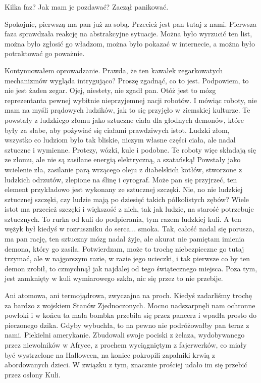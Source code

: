 \ds{} Kilka faz? Jak mam je pozdawać? \dm{} Zaczął panikować. \de{}

\ds{} Spokojnie, pierwszą ma pan już za sobą. Przecież jest pan tutaj z nami. 
Pierwsza faza sprawdzała reakcję na abstrakcyjne sytuacje.
Można było wyrzucić ten list, można było zgłosić go władzom, można było pokazać w internecie, a można było potraktować go poważnie. \de{}

Kontynuowałem oprowadzanie.
Prawda, że ten kawałek zegarkowatych mechanizmów wygląda intrygująco? 
Proszę zgadnąć, co to jest. Podpowiem, to nie jest żaden zegar.
Ojej, niestety, nie zgadł pan.
Otóż jest to mózg reprezentanta pewnej wybitnie nieprzyjemnej nacji robotów.
I mówiąc roboty, nie mam na myśli prądowych ludzików, jak to się przyjęło w ziemskiej kulturze.
Te powstały z ludzkiego złomu jako sztuczne ciała dla głodnych demonów, które były za słabe, aby pożywiać się ciałami prawdziwych istot.
Ludzki złom, wszystko co ludziom było tak bliskie, niczym własne części ciała, ale nadal sztuczne i wymienne. Protezy, wózki, kule i podobne.
Te roboty więc składają się ze złomu, ale nie są zasilane energią elektryczną, a szatańską!
Powstały jako wcielenie zła, zasilanie parą wrzącego oleju z diabelskich kotłów, stworzone z ludzkich odrzutów, zlepione na ślinę i cyrograf.
Może pan się przyjrzeć, ten element przykładowo jest wykonany ze sztucznej szczęki.
Nie, no nie ludzkiej sztucznej szczęki, czy ludzie mają po dziesięć takich półkolistych zębów?
Wiele istot ma przecież szczęki i większość z nich, tak jak ludzie, na starość potrzebuje sztucznych.
To rurka od kuli do podpierania, tym razem ludzkiej kuli. A ten wężyk był kiedyś w rozruszniku do serca... smoka.
Tak, całość nadal się porusza, ma pan rację, ten sztuczny mózg nadal żyje, ale akurat nie pamiętam imienia demona, który go zasila.
Potwierdzam, może to trochę niebezpieczne go tutaj trzymać, ale w najgorszym razie, w razie jego ucieczki, i tak pierwsze co by ten demon zrobił, to czmychnął jak najdalej od tego świątecznego miejsca. Poza tym, jest zamknięty w kuli wymiarowego szkła, nic się przez to nie przebije.

Ani atomowa, ani termojądrowa, zwyczajna na proch. Kiedyś zadarliśmy trochę za bardzo z wojskiem Stanów Zjednoczonych. 
Mocno nadszarpnęli nam ochronne powłoki i w końcu ta mała bombka przebiła się przez pancerz i wpadła prosto do pieczonego dzika.
Gdyby wybuchła, to na pewno nie podróżowałby pan teraz z nami.
Piekielni amerykanie. Zbudowali swoje pociski z żelaza, wydobywanego przez niewolników w Afryce,
z prochem wyciągniętym z fajerwerków, co miały być wystrzelone na Halloween, na koniec pokropili zapalniki krwią z abordowanych dzieci.
W związku z tym, znacznie prościej udało im się przebić przez osłony Kuli.

